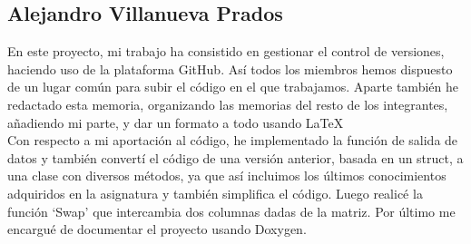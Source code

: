 \documentclass[a4paper, 11pt, spanish]{article}
\begin{document}
\subsection{Alejandro Villanueva Prados}

En este proyecto, mi trabajo ha consistido en gestionar el control de versiones, haciendo uso de la plataforma GitHub. Así todos los miembros hemos dispuesto de un lugar común para subir el código en el que trabajamos. Aparte también he redactado esta memoria, organizando las memorias del resto de los integrantes, añadiendo mi parte, y dar un formato a todo usando \LaTeX
\\

Con respecto a mi aportación al código, he implementado la función de salida de datos y también convertí el código de una versión anterior, basada en un struct, a una clase con diversos métodos, ya que así incluimos los últimos conocimientos adquiridos en la asignatura y también simplifica el código. Luego realicé la función `Swap' que intercambia dos columnas dadas de la matriz. Por último me encargué de documentar el proyecto usando Doxygen.
\end{document}

